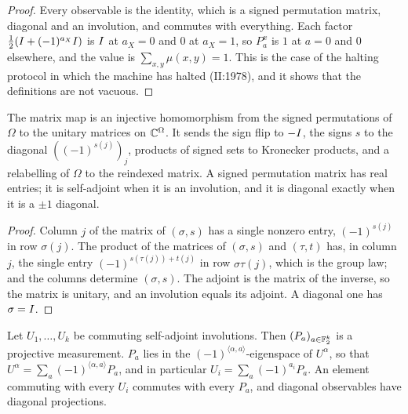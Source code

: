 \begin{proof}
\leanok
Every observable is the identity, which is a signed permutation matrix, diagonal and an
involution, and commutes with everything. Each factor $\frac12(I + (-1)^{a_X}I)$ is $I$
at $a_X = 0$ and $0$ at $a_X = 1$, so $P^x_a$ is $1$ at $a = 0$ and $0$ elsewhere, and the
value is $\sum_{x, y} \mu(x, y) = 1$. This is the case of the halting protocol in which the
machine has halted (II:1978), and it shows that the definitions are not vacuous.
\end{proof}

\begin{lemma}
\label{lem:signed-perm}
\leanok
The matrix map is an injective homomorphism from the signed permutations of $\Omega$ to the
unitary matrices on $\mathbb{C}^\Omega$. It sends the sign flip to $-I$, the signs $s$ to the diagonal
$((-1)^{s(j)})_j$, products of signed sets to Kronecker products, and a relabelling of $\Omega$
to the reindexed matrix. A signed permutation matrix has real entries; it is self-adjoint when
it is an involution, and it is diagonal exactly when it is a $\pm 1$ diagonal.
\end{lemma}

\begin{proof}
\leanok
Column $j$ of the matrix of $(\sigma, s)$ has a single nonzero entry, $(-1)^{s(j)}$ in row
$\sigma(j)$. The product of the matrices of $(\sigma, s)$ and $(\tau, t)$ has, in column $j$, the
single entry $(-1)^{s(\tau(j)) + t(j)}$ in row $\sigma\tau(j)$, which is the group law; and the
columns determine $(\sigma, s)$. The adjoint is the matrix of the inverse, so the matrix is
unitary, and an involution equals its adjoint. A diagonal one has $\sigma = I$.
\end{proof}

\begin{lemma}
\label{lem:fourier-pvm}
\leanok
Let $U_1, \dots, U_k$ be commuting self-adjoint involutions. Then $(P_a)_{a \in \mathbb{F}_2^k}$ is a
projective measurement. $P_a$ lies in the $(-1)^{\langle \alpha, a\rangle}$-eigenspace of
$U^\alpha$, so that $U^\alpha = \sum_a (-1)^{\langle \alpha, a\rangle} P_a$, and in particular
$U_i = \sum_a (-1)^{a_i} P_a$. An element commuting with every $U_i$ commutes with every $P_a$,
and diagonal observables have diagonal projections.
\end{lemma}

